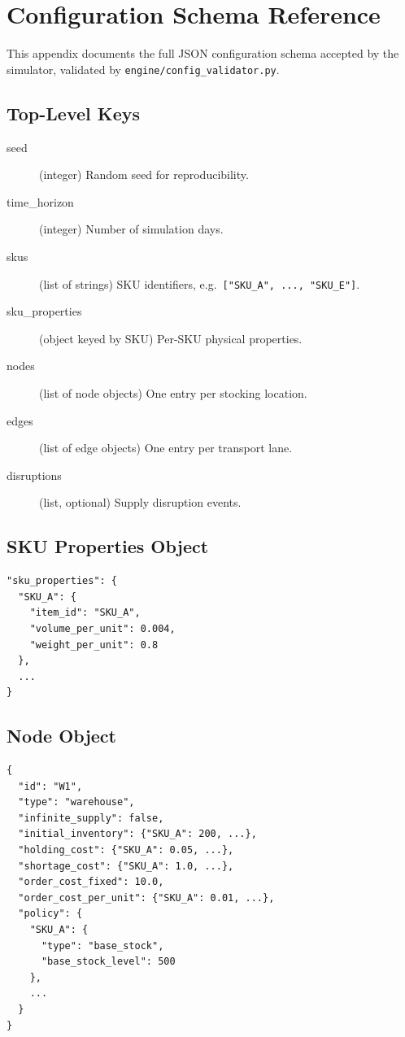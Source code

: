 \chapter{Configuration Schema Reference}
\label{appn:config}

This appendix documents the full JSON configuration schema accepted by
the simulator, validated by \texttt{engine/config\_validator.py}.

\section*{Top-Level Keys}

\begin{description}
  \item[seed] (integer) Random seed for reproducibility.
  \item[time\_horizon] (integer) Number of simulation days.
  \item[skus] (list of strings) SKU identifiers, e.g.\
        \texttt{["SKU\_A", ..., "SKU\_E"]}.
  \item[sku\_properties] (object keyed by SKU) Per-SKU physical properties.
  \item[nodes] (list of node objects) One entry per stocking location.
  \item[edges] (list of edge objects) One entry per transport lane.
  \item[disruptions] (list, optional) Supply disruption events.
\end{description}

\section*{SKU Properties Object}

\begin{verbatim}
"sku_properties": {
  "SKU_A": {
    "item_id": "SKU_A",
    "volume_per_unit": 0.004,
    "weight_per_unit": 0.8
  },
  ...
}
\end{verbatim}

\section*{Node Object}

\begin{verbatim}
{
  "id": "W1",
  "type": "warehouse",
  "infinite_supply": false,
  "initial_inventory": {"SKU_A": 200, ...},
  "holding_cost": {"SKU_A": 0.05, ...},
  "shortage_cost": {"SKU_A": 1.0, ...},
  "order_cost_fixed": 10.0,
  "order_cost_per_unit": {"SKU_A": 0.01, ...},
  "policy": {
    "SKU_A": {
      "type": "base_stock",
      "base_stock_level": 500
    },
    ...
  }
}
\end{verbatim}

